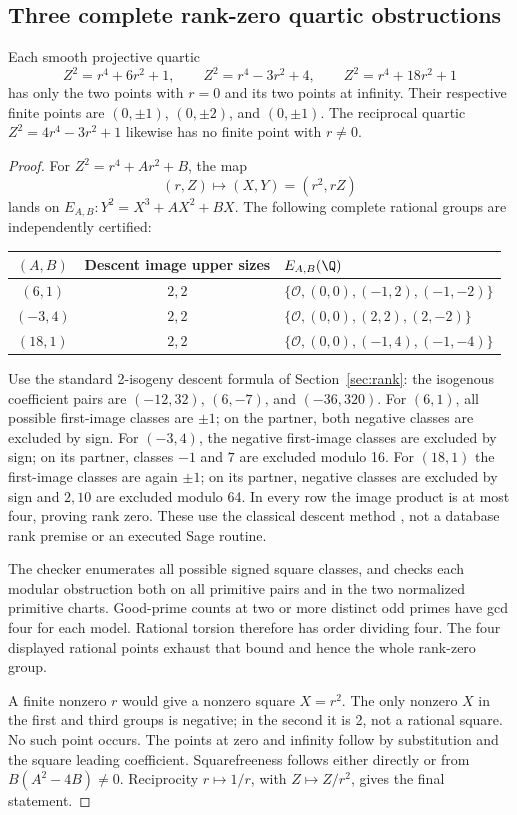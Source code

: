 \subsection{Three complete rank-zero quartic obstructions}
\begin{proposition}\label{prop:d1quartics}
Each smooth projective quartic
\[
 Z^2=r^4+6r^2+1,\qquad
 Z^2=r^4-3r^2+4,\qquad
 Z^2=r^4+18r^2+1
\]
has only the two points with $r=0$ and its two points at infinity. Their respective finite points are $(0,\pm1)$, $(0,\pm2)$, and $(0,\pm1)$. The reciprocal quartic $Z^2=4r^4-3r^2+1$ likewise has no finite point with $r\ne0$.
\end{proposition}
\begin{proof}
For $Z^2=r^4+Ar^2+B$, the map
\[
 (r,Z)\longmapsto (X,Y)=(r^2,rZ)
\]
lands on $E_{A,B}:Y^2=X^3+AX^2+BX$. The following complete rational groups are independently certified:
\begin{center}\small
\begin{tabular}{ccl}
\toprule
$(A,B)$ & Descent image upper sizes & $E_{A,B}(\Q)$\\
\midrule
$(6,1)$ &$2,2$& $\{\mathcal O,(0,0),(-1,2),(-1,-2)\}$\\
$(-3,4)$ &$2,2$& $\{\mathcal O,(0,0),(2,2),(2,-2)\}$\\
$(18,1)$ &$2,2$& $\{\mathcal O,(0,0),(-1,4),(-1,-4)\}$\\
\bottomrule
\end{tabular}\end{center}
Use the standard 2-isogeny descent formula of Section~\ref{sec:rank}: the isogenous coefficient pairs are $(-12,32)$, $(6,-7)$, and $(-36,320)$. For $(6,1)$, all possible first-image classes are $\pm1$; on the partner, both negative classes are excluded by sign. For $(-3,4)$, the negative first-image classes are excluded by sign; on its partner, classes $-1$ and $7$ are excluded modulo 16. For $(18,1)$ the first-image classes are again $\pm1$; on its partner, negative classes are excluded by sign and $2,10$ are excluded modulo 64. In every row the image product is at most four, proving rank zero. These use the classical descent method \cite{SageDescent}, not a database rank premise or an executed Sage routine.

The checker enumerates all possible signed square classes, and checks each modular obstruction both on all primitive pairs and in the two normalized primitive charts. Good-prime counts at two or more distinct odd primes have gcd four for each model. Rational torsion therefore has order dividing four. The four displayed rational points exhaust that bound and hence the whole rank-zero group.

A finite nonzero $r$ would give a nonzero square $X=r^2$. The only nonzero $X$ in the first and third groups is negative; in the second it is 2, not a rational square. No such point occurs. The points at zero and infinity follow by substitution and the square leading coefficient. Squarefreeness follows either directly or from $B(A^2-4B)\ne0$. Reciprocity $r\mapsto1/r$, with $Z\mapsto Z/r^2$, gives the final statement.
\end{proof}

